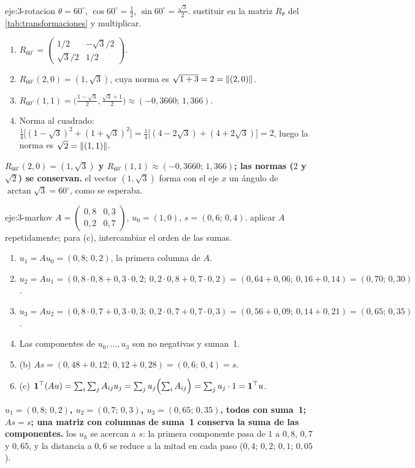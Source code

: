 \begin{solucion}{eje:3-rotacion}
\datos $\theta=60^\circ$, $\cos 60^\circ=\tfrac12$, $\sin 60^\circ=\tfrac{\sqrt3}{2}$.
\planteamiento sustituir en la matriz $R_\theta$ del \cref{tab:transformaciones} y multiplicar.
\pasos
\begin{enumerate}[label=\arabic*.]
  \item $R_{60^\circ}=\begin{pmatrix}1/2&-\sqrt3/2\\ \sqrt3/2&1/2\end{pmatrix}$.
  \item $R_{60^\circ}(2,0)=(1,\sqrt3)$, cuya norma es $\sqrt{1+3}=2=\lVert(2,0)\rVert$.
  \item $R_{60^\circ}(1,1)=\bigl(\tfrac{1-\sqrt3}{2},\tfrac{\sqrt3+1}{2}\bigr)\approx(-0{,}3660;\,1{,}366)$.
  \item Norma al cuadrado: $\tfrac14\bigl[(1-\sqrt3)^{2}+(1+\sqrt3)^{2}\bigr]=\tfrac14\bigl[(4-2\sqrt3)+(4+2\sqrt3)\bigr]=2$, luego la norma es $\sqrt2=\lVert(1,1)\rVert$.
\end{enumerate}
\resultado \textbf{$R_{60^\circ}(2,0)=(1,\sqrt3)$ y $R_{60^\circ}(1,1)\approx(-0{,}3660;\,1{,}366)$; las normas ($2$ y $\sqrt2$) se conservan.}
\comprobacion el vector $(1,\sqrt3)$ forma con el eje $x$ un ángulo de $\arctan\sqrt3=60^\circ$, como se esperaba.
\end{solucion}

\begin{solucion}{eje:3-markov}
\datos $A=\begin{pmatrix}0{,}8&0{,}3\\0{,}2&0{,}7\end{pmatrix}$, $u_0=(1,0)$, $s=(0{,}6;\,0{,}4)$.
\planteamiento aplicar $A$ repetidamente; para (c), intercambiar el orden de las sumas.
\pasos
\begin{enumerate}[label=\arabic*.]
  \item $u_1=Au_0=(0{,}8;\,0{,}2)$, la primera columna de $A$.
  \item $u_2=Au_1=(0{,}8\cdot 0{,}8+0{,}3\cdot 0{,}2;\ 0{,}2\cdot 0{,}8+0{,}7\cdot 0{,}2)=(0{,}64+0{,}06;\ 0{,}16+0{,}14)=(0{,}70;\,0{,}30)$.
  \item $u_3=Au_2=(0{,}8\cdot 0{,}7+0{,}3\cdot 0{,}3;\ 0{,}2\cdot 0{,}7+0{,}7\cdot 0{,}3)=(0{,}56+0{,}09;\ 0{,}14+0{,}21)=(0{,}65;\,0{,}35)$.
  \item Las componentes de $u_0,\dots,u_3$ son no negativas y suman~1.
  \item (b) $As=(0{,}48+0{,}12;\ 0{,}12+0{,}28)=(0{,}6;\,0{,}4)=s$.
  \item (c) $\mathbf{1}^{\top}(Au)=\sum_{i}\sum_{j}A_{ij}u_j=\sum_ju_j\Bigl(\sum_iA_{ij}\Bigr)=\sum_ju_j\cdot 1=\mathbf{1}^{\top}u$.
\end{enumerate}
\resultado \textbf{$u_1=(0{,}8;\,0{,}2)$, $u_2=(0{,}7;\,0{,}3)$, $u_3=(0{,}65;\,0{,}35)$, todos con suma~1; $As=s$; una matriz con columnas de suma~1 conserva la suma de las componentes.}
\comprobacion los $u_k$ se acercan a $s$: la primera componente pasa de $1$ a $0{,}8$, $0{,}7$ y $0{,}65$, y la distancia a $0{,}6$ se reduce a la mitad en cada paso ($0{,}4$; $0{,}2$; $0{,}1$; $0{,}05$).
\end{solucion}

